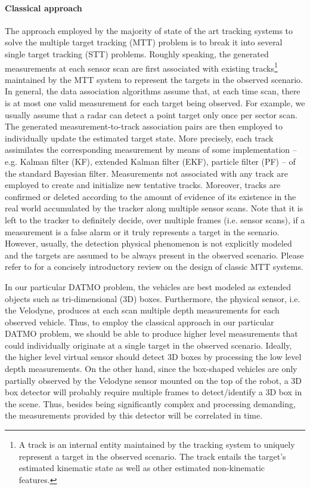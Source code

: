 \documentclass[letterpaper]{article}
\begin{document}
\paragraph{Classical approach} The approach employed by the majority of state of the art tracking systems to solve the multiple target tracking (MTT) problem is to break it into several single target tracking (STT) problems. Roughly speaking, the generated measurements at each sensor scan are first associated with existing tracks\footnote{A track is an internal entity maintained by the tracking system to uniquely represent a target in the observed scenario. The track entails the target's estimated kinematic state as well as other estimated non-kinematic features.} maintained by the MTT system to represent the targets in the observed scenario. In general, the data association algorithms assume that, at each time scan, there is at most one valid measurement for each target being observed. For example, we usually assume that a radar can detect a point target only once per sector scan. The generated measurement-to-track association pairs are then employed to individually update the estimated target state. More precisely, each track assimilates the corresponding measurement by means of some implementation -- e.g. Kalman filter (KF), extended Kalman filter (EKF), particle filter (PF) -- of the standard Bayesian filter. Measurements not associated with any track are employed to create and initialize new tentative tracks. Moreover, tracks are confirmed or deleted according to the amount of evidence of its existence in the real world accumulated by the tracker along multiple sensor scans. Note that it is left to the tracker to definitely decide, over multiple frames (i.e. sensor scans), if a measurement is a false alarm or it truly represents a target in the scenario. However, usually, the detection physical phenomenon is not explicitly modeled and the targets are assumed to be always present in the observed scenario. Please refer to \cite{Barsh1} for a concisely introductory review on the design of classic MTT systems.

In our particular DATMO problem, the vehicles are best modeled as extended objects such as tri-dimensional (3D) boxes. Furthermore, the physical sensor, i.e. the Velodyne, produces at each scan multiple depth measurements for each observed vehicle. Thus, to employ the classical approach in our particular DATMO problem, we should be able to produce higher level measurements that could individually originate at a single target in the observed scenario. Ideally, the higher level virtual sensor should detect 3D boxes by processing the low level depth measurements. On the other hand, since the box-shaped vehicles are only partially observed by the Velodyne sensor mounted on the top of the robot, a 3D box detector will probably require multiple frames to detect/identify a 3D box in the scene. Thus, besides being significantly complex and processing demanding, the measurements provided by this detector will be correlated in time.
\end{document}
